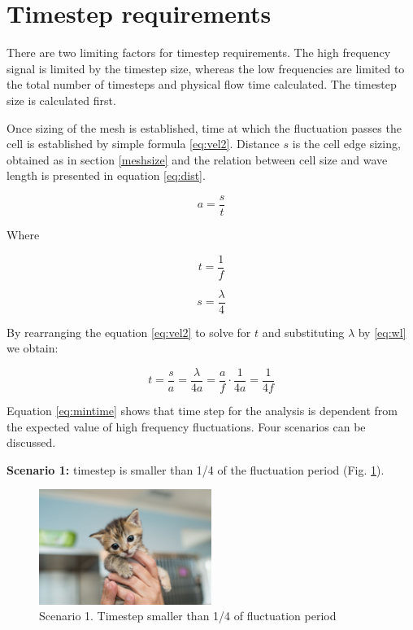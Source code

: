 \section{Timestep requirements} \label{timestepsize}
There are two limiting factors for timestep requirements. The high frequency signal is limited by the timestep size, whereas the low frequencies are limited to the total number of timesteps and physical flow time calculated. The timestep size is calculated first.

Once sizing of the mesh is established, time at which the fluctuation passes the cell is established by simple formula \ref{eq:vel2}. Distance $s$ is the cell edge sizing, obtained as in section \ref{meshsize} and the relation between cell size and wave length is presented in equation \ref{eq:dist}.

\begin{equation} \label{eq:vel2}
a = \frac{s}{t}
\end{equation}

Where

\begin{equation} \label{eq:time}
t = \frac{1}{f}
\end{equation}

\begin{equation} \label{eq:dist}
s = \frac{\lambda}{4}
\end{equation}

By rearranging the equation \ref{eq:vel2} to solve for $t$ and substituting $\lambda$ by \ref{eq:wl} we obtain:

\begin{equation} \label{eq:mintime}
t = \frac{s}{a} = \frac{\lambda}{4a} = \frac{a}{f} \cdot \frac{1}{4a} = \frac{1}{4f}
\end{equation}

Equation \ref{eq:mintime} shows that time step for the analysis is dependent from the expected value of high frequency fluctuations. Four scenarios can be discussed.

\textbf{Scenario 1:} timestep is smaller than 1/4 of the fluctuation period (Fig. \ref{time1}).

\begin{figure}[h!]
\centering %
\includegraphics[width=0.5\textwidth]{Pictures/kitten-placeholder.jpg}
\caption{Scenario 1. Timestep smaller than 1/4 of fluctuation period}
\label{time1}
\end{figure}

